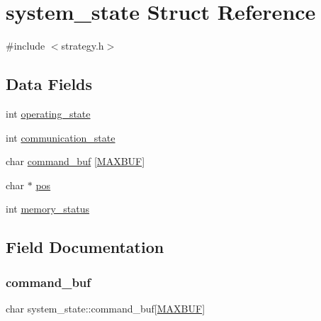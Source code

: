 \hypertarget{structsystem__state}{}\section{system\+\_\+state Struct Reference}
\label{structsystem__state}


{\ttfamily \#include $<$strategy.\+h$>$}

\subsection*{Data Fields}
\begin{DoxyCompactItemize}
\item 
int \hyperlink{structsystem__state_a0a9a175c3932a1454451380007771f0d}{operating\+\_\+state}
\item 
int \hyperlink{structsystem__state_aafadbaca2fa32753a9d328b0f727e8e9}{communication\+\_\+state}
\item 
char \hyperlink{structsystem__state_a355aace4e54c8d32e6a6fc5e9d52f374}{command\+\_\+buf} \mbox{[}\hyperlink{strategy_8h_ad7871643c05865c80f5d8050aead2b57}{M\+A\+X\+B\+UF}\mbox{]}
\item 
char $\ast$ \hyperlink{structsystem__state_a025b72e1efd0199dd93a1265affda3aa}{pos}
\item 
int \hyperlink{structsystem__state_ab361eff610b853cc61392ff6a608687d}{memory\+\_\+status}
\end{DoxyCompactItemize}


\subsection{Field Documentation}
\mbox{\label{structsystem__state_a355aace4e54c8d32e6a6fc5e9d52f374}} 
\subsubsection{\texorpdfstring{command\+\_\+buf}{command\_buf}}
{\footnotesize\ttfamily char system\+\_\+state\+::command\+\_\+buf\mbox{[}\hyperlink{strategy_8h_ad7871643c05865c80f5d8050aead2b57}{M\+A\+X\+B\+UF}\mbox{]}}

\mbox{\label{structsystem__state_aafadbaca2fa32753a9d328b0f727e8e9}} 
